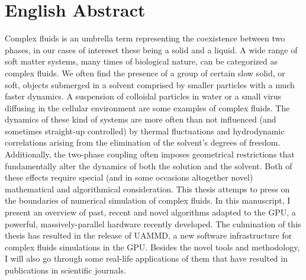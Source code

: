 \documentclass[ twoside,openright,titlepage,numbers=noenddot,%
headinclude,footinclude,cleardoublepage=empty,abstract=on,
BCOR=5mm,paper=a4,fontsize=11pt, dvipsnames
]{scrreprt}
\begin{document}
\frenchspacing
\raggedbottom
{} %
\pagestyle{plain}




\cleardoublepage
\cleardoublepage
\begingroup
\let\cleardoublepage\relax
\let\cleardoublepage\relax
\let\cleardoublepage\relax

\chapter*{English Abstract}

Complex fluids is an umbrella term representing the coexistence between two phases, in our cases of intereset these being a solid and a liquid. A wide range of soft matter systems, many times of biological nature, can be categorized as complex fluids. We often find the presence of a group of certain slow solid, or soft, objects submerged in a solvent comprised by smaller particles with a much faster dynamics. A suspension of colloidal particles in water or a small virus diffusing in the cellular environment are some examples of complex fluids. The dynamics of these kind of systems are more often than not influenced (and sometimes straight-up controlled) by thermal fluctuations and hydrodynamic correlations arising from the elimination of the solvent's degrees of freedom. Additionally, the two-phase coupling often imposes geometrical restrictions that fundamentally alter the dynamics of both the solution and the solvent. Both of these effects require special (and in some occasions altogether novel) mathematical and algorithmical consideration. This thesis attemps to press on the boundaries of numerical simulation of complex fluids. In this manuscript, I present an overview of past, recent and novel algorithms adapted to the GPU, a powerful, massively-parallel hardware recently developed. The culmination of this thesis has resulted in the release of UAMMD, a new software infrastructure for complex fluids simulations in the GPU. Besides the novel tools and methodology, I will also go through some real-life applications of them that have resulted in publications in scientific journals.
\end{document}
